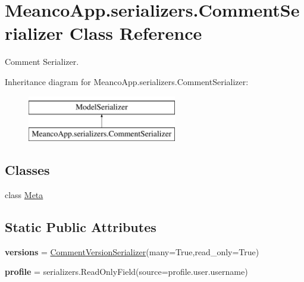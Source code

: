 \hypertarget{class_meanco_app_1_1serializers_1_1_comment_serializer}{}\section{Meanco\+App.\+serializers.\+Comment\+Serializer Class Reference}
\label{class_meanco_app_1_1serializers_1_1_comment_serializer}


Comment Serializer.  


Inheritance diagram for Meanco\+App.\+serializers.\+Comment\+Serializer\+:\begin{figure}[H]
\begin{center}
\leavevmode
\includegraphics[height=2.000000cm]{class_meanco_app_1_1serializers_1_1_comment_serializer}
\end{center}
\end{figure}
\subsection*{Classes}
\begin{DoxyCompactItemize}
\item 
class \hyperlink{class_meanco_app_1_1serializers_1_1_comment_serializer_1_1_meta}{Meta}
\end{DoxyCompactItemize}
\subsection*{Static Public Attributes}
\begin{DoxyCompactItemize}
\item 
\hypertarget{class_meanco_app_1_1serializers_1_1_comment_serializer_af8981cf4f3ed4a3ea5a18a3cc5b98136}{}\label{class_meanco_app_1_1serializers_1_1_comment_serializer_af8981cf4f3ed4a3ea5a18a3cc5b98136} 
{\bfseries versions} = \hyperlink{class_meanco_app_1_1serializers_1_1_comment_version_serializer}{Comment\+Version\+Serializer}(many=True,read\+\_\+only=True)
\item 
\hypertarget{class_meanco_app_1_1serializers_1_1_comment_serializer_a84a7241ff7933a67afe61a0e250c9e5a}{}\label{class_meanco_app_1_1serializers_1_1_comment_serializer_a84a7241ff7933a67afe61a0e250c9e5a} 
{\bfseries profile} = serializers.\+Read\+Only\+Field(source=\textquotesingle{}profile.\+user.\+username\textquotesingle{})
\end{DoxyCompactItemize}


